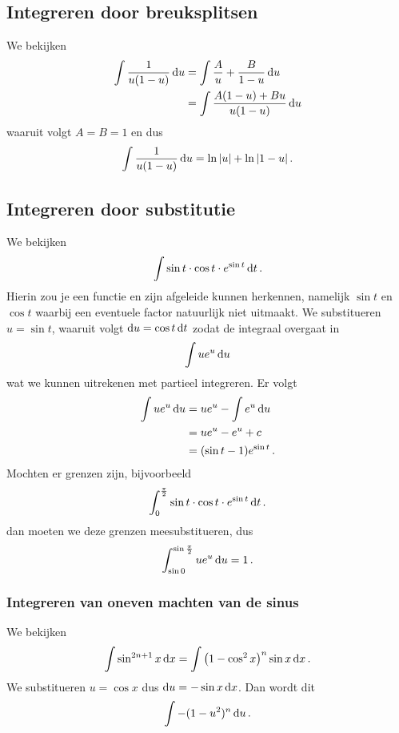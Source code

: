 \subsection{Integreren door breuksplitsen}\label{subsec:integrerenDoorBreuksplitsen}

We bekijken
\begin{align*}
    \int \frac{1}{u(1-u)} \mathop{}\!\mathrm{d} u &= \int \frac{A}{u} + \frac{B}{1-u} \mathop{}\!\mathrm{d} u \\
    &= \int \frac{A(1-u)+Bu}{u(1-u)} \mathop{}\!\mathrm{d} u
\end{align*}
waaruit volgt $A=B=1$ en dus
\[ \int \frac{1}{u(1-u)} \mathop{}\!\mathrm{d} u = \ln |u| + \ln |1-u|\,. \]
\subsection{Integreren door substitutie}\label{subsec:integrerenDoorSubstitutie}
We bekijken
\[ \int \sin t \cdot \cos t \cdot e^{\sin t} \mathop{}\!\mathrm{d} t\,. \]
Hierin zou je een functie en zijn afgeleide kunnen herkennen, namelijk
$\sin t$ en $\cos t$ waarbij een eventuele factor natuurlijk niet uitmaakt.
We substitueren $u = \sin t$, waaruit volgt $\mathop{}\!\mathrm{d} u = \cos t \mathop{}\!\mathrm{d} t$
zodat de integraal overgaat in
\[ \int u e^u \mathop{}\!\mathrm{d} u \]
wat we kunnen uitrekenen met partieel integreren.
Er volgt
\begin{align*}
    \int u e^u \mathop{}\!\mathrm{d} u &= u e^u - \int e^u \mathop{}\!\mathrm{d} u \\
    &= u e^u - e^u + c \\
    &= (\sin t -1) e^{\sin t} \,.
\end{align*}
Mochten er grenzen zijn, bijvoorbeeld
\[ \int_0^{\frac{\pi}{2}} \sin t \cdot \cos t \cdot e^{\sin t} \mathop{}\!\mathrm{d} t\,. \]
dan moeten we deze grenzen meesubstitueren, dus
\[ \int_{\sin 0}^{\sin \frac{\pi}{2}} u e^u \mathop{}\!\mathrm{d} u = 1\,. \]
\subsubsection{Integreren van oneven machten van de sinus}
We bekijken
\begin{align*}
    \int \sin^{2n+1} x \mathop{}\!\mathrm{d} x = \int \left( 1-\cos^2 x \right)^n \sin x \mathop{}\!\mathrm{d} x \,.
\end{align*}
We substitueren $u=\cos x$ dus $\mathop{}\!\mathrm{d} u = - \sin x \mathop{}\!\mathrm{d} x$.
Dan wordt dit
\begin{align*}
    \int -(1-u^2)^n \mathop{}\!\mathrm{d} u\,.
\end{align*}